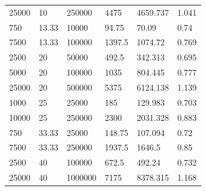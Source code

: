 \documentclass[11pt]{article}
\newcommand{\+}{\discretionary{\mbox{\scriptsize$\hookleftarrow$}}{}{}}
\begin{document}
\begin{table}[]
\begin{tabular}{|l|l|l|l|l||l|}
	25000                   & 10                                & 250000                    & 4475                          & 4659.737                 & 1.041                                  \\
	750                     & 13.33                             & 10000                     & 94.75                         & 70.09                    & 0.74                                   \\
	7500                    & 13.33                             & 100000                    & 1397.5                        & 1074.72                  & 0.769                                  \\
	2500                    & 20                                & 50000                     & 492.5                         & 342.313                  & 0.695                                  \\
	5000                    & 20                                & 100000                    & 1035                          & 804.445                  & 0.777                                  \\
	25000                   & 20                                & 500000                    & 5375                          & 6124.138                 & 1.139                                  \\
	1000                    & 25                                & 25000                     & 185                           & 129.983                  & 0.703                                  \\
	10000                   & 25                                & 250000                    & 2300                          & 2031.328                 & 0.883                                  \\
	750                     & 33.33                             & 25000                     & 148.75                        & 107.094                  & 0.72                                   \\
	7500                    & 33.33                             & 250000                    & 1937.5                        & 1646.5                   & 0.85                                   \\
	2500                    & 40                                & 100000                    & 672.5                         & 492.24                   & 0.732                                  \\
	25000                   & 40                                & 1000000                   & 7175                          & 8378.315                 & 1.168                                  \\

\end{tabular}
\end{table}
\end{document}

